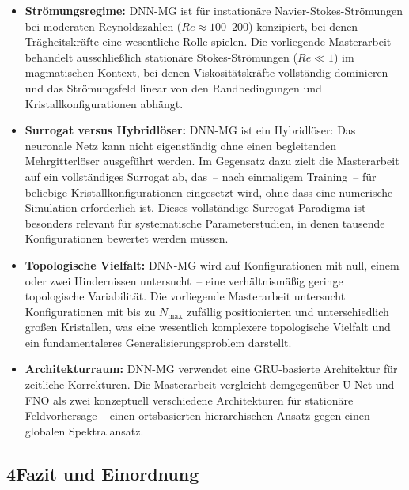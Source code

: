 \documentclass[a4paper,12pt]{article}
\begin{document}
\begin{itemize}
    \item \textbf{Strömungsregime:} DNN-MG ist für instationäre
    Navier-Stokes-Strömungen bei moderaten Reynoldszahlen
    ($Re \approx 100$--$200$) konzipiert, bei denen Trägheitskräfte
    eine wesentliche Rolle spielen. Die vorliegende Masterarbeit
    behandelt ausschließlich stationäre Stokes-Strömungen
    ($Re \ll 1$) im magmatischen Kontext, bei denen Viskositätskräfte
    vollständig dominieren und das Strömungsfeld linear von den
    Randbedingungen und Kristallkonfigurationen abhängt.

    \item \textbf{Surrogat versus Hybridlöser:} DNN-MG ist ein
    Hybridlöser: Das neuronale Netz kann nicht eigenständig ohne
    einen begleitenden Mehrgitterlöser ausgeführt werden.
    Im Gegensatz dazu zielt die Masterarbeit auf ein
    vollständiges Surrogat ab, das~-- nach einmaligem Training~--
    für beliebige Kristallkonfigurationen eingesetzt wird,
    ohne dass eine numerische Simulation erforderlich ist.
    Dieses vollständige Surrogat-Paradigma ist besonders relevant
    für systematische Parameterstudien, in denen tausende
    Konfigurationen bewertet werden müssen.

    \item \textbf{Topologische Vielfalt:} DNN-MG wird auf
    Konfigurationen mit null, einem oder zwei Hindernissen
    untersucht~-- eine verhältnismäßig geringe topologische
    Variabilität. Die vorliegende Masterarbeit untersucht
    Konfigurationen mit bis zu $N_\text{max}$ zufällig
    positionierten und unterschiedlich großen Kristallen,
    was eine wesentlich komplexere topologische Vielfalt
    und ein fundamentaleres Generalisierungsproblem darstellt.

    \item \textbf{Architekturraum:} DNN-MG verwendet eine
    GRU-basierte Architektur für zeitliche Korrekturen.
    Die Masterarbeit vergleicht demgegenüber U-Net
    und FNO als zwei konzeptuell verschiedene Architekturen
    für stationäre Feldvorhersage -- einen ortsbasierten
    hierarchischen Ansatz gegen einen globalen Spektralansatz.
\end{itemize}

\subsection*{4\quad Fazit und Einordnung}
\end{document}
